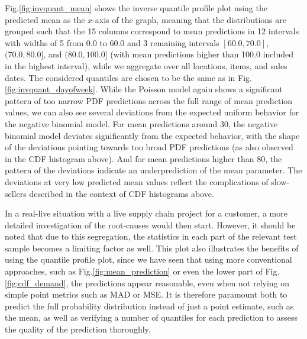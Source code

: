 \documentclass[BCOR=1mm, DIV=calc,10pt,
twoside=true,
twocolumn,
headings=normal]{scrartcl}
\newcommand{\fig}{Fig.}
\begin{document}
\fig \ref{fig:invquant_mean} shows the inverse quantile profile plot using the predicted mean as the $x$-axis of the graph, meaning that the distributions are grouped such that the 15 columns correspond to mean predictions in 12 intervals with widths of 5 from 0.0 to 60.0 and 3 remaining intervals $[60.0, 70.0]$, $(70.0, 80.0]$, and $(80.0, 100.0]$ (with mean predictions higher than 100.0 included in the highest interval), while we aggregate over all locations, items, and sales dates. The considered quantiles are chosen to be the same as in \fig \ref{fig:invquant_dayofweek}. While the Poisson model again shows a significant pattern of too narrow PDF predictions across the full range of mean prediction values, we can also see several deviations from the expected uniform behavior for the negative binomial model. For mean predictions around $30$, the negative binomial model deviates significantly from the expected behavior, with the shape of the deviations pointing towards too broad PDF predictions (as also observed in the CDF histogram above). And for mean predictions higher than $80$, the pattern of the deviations indicate an underprediction of the mean parameter. The deviations at very low predicted mean values reflect the complications of slow-sellers described in the context of CDF histograms above.

\noindent
In a real-live situation with a live supply chain project for a customer, a more detailed investigation of the root-causes would then start. However, it should be noted that due to this segregation, the statistics in each part of the relevant test sample becomes a limiting factor as well. This plot also illustrates the benefits of using the quantile profile plot, since we have seen that using more conventional approaches, such as \fig \ref{fig:mean_prediction} or even the lower part of \fig \ref{fig:cdf_demand}, the predictions appear reasonable, even when not relying on simple point metrics such as MAD or MSE. It is therefore paramount both to predict the full probability distribution instead of just a point estimate, such as the mean, as well as verifying a number of quantiles for each prediction to assess the quality of the prediction thoroughly.
\end{document}
